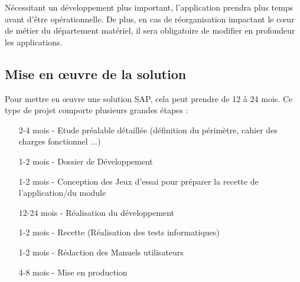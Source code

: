 Nécessitant un développement plus important, l'application prendra plus temps
avant d'être opérationnelle. De plus, en cas de réorganisation
impactant le cœur de métier du département matériel, il sera obligatoire de modifier
en profondeur les applications. 

\subsection{Mise en œuvre de la solution}
Pour mettre en œuvre une solution SAP, cela peut prendre de 12 à 24 mois.
Ce type de projet comporte plusieurs grandes étapes :

\begin{itemize}
	\item[2-4 mois -] Etude préalable détaillée (définition du périmètre, cahier des charges fonctionnel ...)
	\item[1-2 mois -] Dossier de Développement
	\item[1-2 mois -] Conception des Jeux d’essai pour préparer la recette de l'application/du module
	\item[12-24 mois -] Réalisation du développement
	\item[1-2 mois -] Recette (Réalisation des tests informatiques)
	\item[1-2 mois -] Rédaction des Manuels utilisateurs
	\item[4-8 mois -] Mise en production
\end{itemize}
